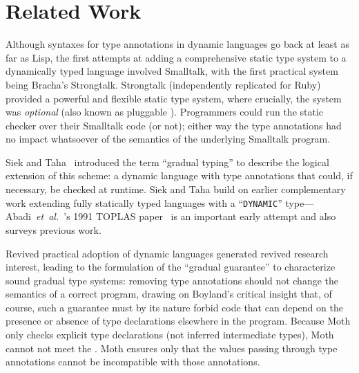
\section{Related Work}
\label{sec:related-work}

Although syntaxes for type annotations in dynamic languages go back at
least as far as Lisp\citep{cltl2}, the first attempts at adding a
comprehensive static type system to a dynamically typed
language involved 
Smalltalk\citep{RalphJohnson1986}, with the first practical system
being Bracha's Strongtalk\citep{strongtalk}. Strongtalk
(independently replicated for Ruby\citep{DBRuby09}) provided a
powerful and flexible static type system, where crucially, the system
was \emph{optional} (also known as pluggable
\cite{GiladPluggable2004}). Programmers could run the static checker
over their Smalltalk code (or not); either way the type annotations
had no impact whatsoever of the semantics of the underlying Smalltalk
program.

Siek and Taha~\cite{Siek2006} introduced the term ``gradual typing''
 to describe the logical extension of this scheme: a
dynamic language with type annotations that could, if necessary, be
checked at runtime. Siek and Taha build on earlier complementary work extending fully statically typed languages with a ``\texttt{DYNAMIC}''
type---Abadi~\textit{et~al.}~'s 1991 TOPLAS paper~\cite{AbadiTOPLAS1991} is an
important early attempt
and also surveys previous work.

Revived practical adoption of dynamic languages generated revived
research interest, leading to the formulation of the ``gradual
guarantee''\citep{Siek2006,XXXSiek2015} to characterize sound gradual
type systems: removing type annotations should not change the
semantics of a correct program, drawing on Boyland's critical insight
that, of course, such a guarantee must by its nature forbid code that
can depend on the presence or absence of type declarations elsewhere
in the program\citep{Boyland2014}.
Because Moth only checks explicit type declarations (not inferred
intermediate types), Moth cannot not meet the .
Moth ensures only that
the values passing through type annotations cannot be incompatible
with those annotations.

